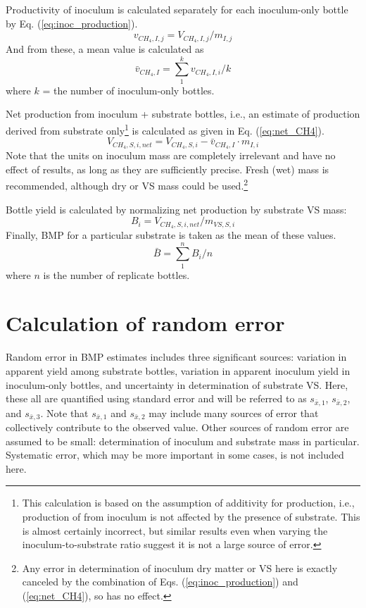 \documentclass[]{article}
\begin{document}
Productivity of inoculum is calculated separately for each inoculum-only bottle by Eq. (\ref{eq:inoc_production}).
\begin{equation}
  \label{eq:inoc_production}
  v_{CH_4, I, j} = V_{CH_4, I, j} / m_{I, j} 
\end{equation}
And from these, a mean value is calculated as 
\begin{equation}
  \label{eq:inoc_productivity}
  \bar{v}_{CH_4, I} = \sum_1 ^k v_{CH_4, I, i} / k
\end{equation}
where $k$ = the number of inoculum-only bottles.

Net  production from inoculum + substrate bottles, i.e., an estimate of  production derived from substrate only\footnote{This calculation is based on the assumption of additivity for  production, i.e., production of  from inoculum is not affected by the presence of substrate. This is almost certainly incorrect, but similar results even when varying the inoculum-to-substrate ratio suggest it is not a large source of error.} is calculated as given in Eq. (\ref{eq:net_CH4}).
\begin{equation}
  \label{eq:net_CH4}
  V_{CH_4, S, i, net} = V_{CH_4, S, i} - \bar{v}_{CH_4, I} \cdot m_{I, i}
\end{equation}
Note that the units on inoculum mass are completely irrelevant and have no effect of results, as long as they are sufficiently precise.
Fresh (wet) mass is recommended, although dry or VS mass could be used.\footnote{Any error in determination of inoculum dry matter or VS here is exactly canceled by the combination of Eqs. (\ref{eq:inoc_production}) and (\ref{eq:net_CH4}), so has no effect.}

Bottle yield is calculated by normalizing net  production by substrate VS mass:
\begin{equation}
  \label{eq:yield}
  B_{i} = V_{CH_4, S, i, net} / m_{VS, S, i}
\end{equation}
Finally, BMP for a particular substrate is taken as the mean of these values.
\begin{equation}
  \label{eq:BMP}
  \bar{B} = \sum_1 ^n B_{i} / n
\end{equation}
where $n$ is the number of replicate bottles.

\section{Calculation of random error}
Random error in BMP estimates includes three significant sources: variation in apparent yield among substrate bottles, variation in apparent inoculum yield in inoculum-only bottles, and uncertainty in determination of substrate VS. 
Here, these all are quantified using standard error and will be referred to as $s_{\bar{x},1}$, $s_{\bar{x},2}$, and $s_{\bar{x},3}$. 
Note that $s_{\bar{x},1}$ and $s_{\bar{x},2}$ may include many sources of error that collectively contribute to the observed value. 
Other sources of random error are assumed to be small: determination of inoculum and substrate mass in particular. 
Systematic error, which may be more important in some cases, is not included here. 
\end{document}
